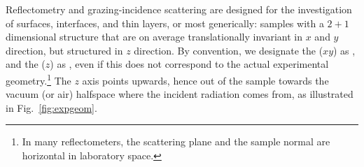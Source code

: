 Reflectometry and grazing-incidence scattering
are designed for the investigation of surfaces, interfaces, and thin layers,
or most generically:
samples with a $2+1$ dimensional structure
that are on average translationally invariant in $x$ and $y$ direction,
but structured in $z$ direction.
By convention,
we designate the  ($xy$) as ,
%
%
and the  ($z$) as ,
%
%
%
even if this does not correspond to the actual experimental geometry.\footnote
{In many reflectometers,
 the scattering plane and the sample normal are horizontal in laboratory space.}
The $z$ axis points upwards, hence out of the sample towards the
vacuum (or air) halfspace where the incident radiation comes from,
as illustrated in Fig.~\ref{fig:expgeom}.

